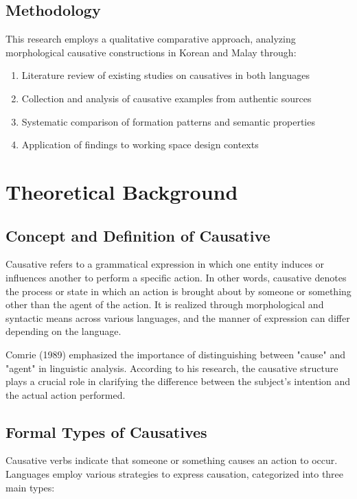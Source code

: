 \documentclass[12pt,a4paper]{article}
\begin{document}
\subsection{Methodology}

This research employs a qualitative comparative approach, analyzing morphological causative constructions in Korean and Malay through:

\begin{enumerate}
\item Literature review of existing studies on causatives in both languages
\item Collection and analysis of causative examples from authentic sources
\item Systematic comparison of formation patterns and semantic properties
\item Application of findings to working space design contexts
\end{enumerate}

\section{Theoretical Background}

\subsection{Concept and Definition of Causative}

Causative refers to a grammatical expression in which one entity induces or influences another to perform a specific action. In other words, causative denotes the process or state in which an action is brought about by someone or something other than the agent of the action. It is realized through morphological and syntactic means across various languages, and the manner of expression can differ depending on the language.

Comrie (1989) emphasized the importance of distinguishing between "cause" and "agent" in linguistic analysis. According to his research, the causative structure plays a crucial role in clarifying the difference between the subject's intention and the actual action performed.

\subsection{Formal Types of Causatives}

Causative verbs indicate that someone or something causes an action to occur. Languages employ various strategies to express causation, categorized into three main types:
\end{document}
